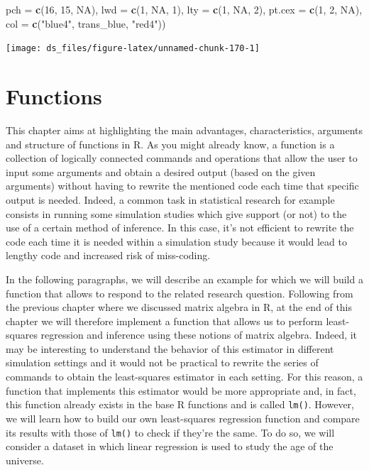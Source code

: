 \documentclass[12pt,]{krantz}
\newenvironment{Shaded}{\begin{snugshade}}{\end{snugshade}}
\newcommand{\KeywordTok}[1]{\textcolor[rgb]{0.27,0.27,0.27}{\textbf{#1}}}
\newcommand{\DataTypeTok}[1]{\textcolor[rgb]{0.27,0.27,0.27}{#1}}
\newcommand{\DecValTok}[1]{\textcolor[rgb]{0.06,0.06,0.06}{#1}}
\newcommand{\StringTok}[1]{\textcolor[rgb]{0.5,0.5,0.5}{#1}}
\newcommand{\OtherTok}[1]{\textcolor[rgb]{0.37,0.37,0.37}{#1}}
\newcommand{\NormalTok}[1]{#1}
\begin{document}
\begin{Shaded}
\begin{Highlighting}[]
       \DataTypeTok{pch =} \KeywordTok{c}\NormalTok{(}\DecValTok{16}\NormalTok{, }\DecValTok{15}\NormalTok{, }\OtherTok{NA}\NormalTok{), }\DataTypeTok{lwd =} \KeywordTok{c}\NormalTok{(}\DecValTok{1}\NormalTok{, }\OtherTok{NA}\NormalTok{, }\DecValTok{1}\NormalTok{), }\DataTypeTok{lty =} \KeywordTok{c}\NormalTok{(}\DecValTok{1}\NormalTok{, }\OtherTok{NA}\NormalTok{, }\DecValTok{2}\NormalTok{), }
       \DataTypeTok{pt.cex =} \KeywordTok{c}\NormalTok{(}\DecValTok{1}\NormalTok{, }\DecValTok{2}\NormalTok{, }\OtherTok{NA}\NormalTok{), }\DataTypeTok{col =} \KeywordTok{c}\NormalTok{(}\StringTok{"blue4"}\NormalTok{, trans_blue, }\StringTok{"red4"}\NormalTok{))}
\end{Highlighting}
\end{Shaded}

\begin{center}\texttt{[image: ds\_files/figure-latex/unnamed-chunk-170-1]} \end{center}

\chapter{Functions}\label{functions}

This chapter aims at highlighting the main advantages, characteristics,
arguments and structure of functions in R. As you might already know, a
function is a collection of logically connected commands and operations
that allow the user to input some arguments and obtain a desired output
(based on the given arguments) without having to rewrite the mentioned
code each time that specific output is needed. Indeed, a common task in
statistical research for example consists in running some simulation
studies which give support (or not) to the use of a certain method of
inference. In this case, it's not efficient to rewrite the code each
time it is needed within a simulation study because it would lead to
lengthy code and increased risk of miss-coding.

In the following paragraphs, we will describe an example for which we
will build a function that allows to respond to the related research
question. Following from the previous chapter where we discussed matrix
algebra in R, at the end of this chapter we will therefore implement a
function that allows us to perform least-squares regression and
inference using these notions of matrix algebra. Indeed, it may be
interesting to understand the behavior of this estimator in different
simulation settings and it would not be practical to rewrite the series
of commands to obtain the least-squares estimator in each setting. For
this reason, a function that implements this estimator would be more
appropriate and, in fact, this function already exists in the base R
functions and is called \texttt{lm()}. However, we will learn how to
build our own least-squares regression function and compare its results
with those of \texttt{lm()} to check if they're the same. To do so, we
will consider a dataset in which linear regression is used to study the
age of the universe.
\end{document}

